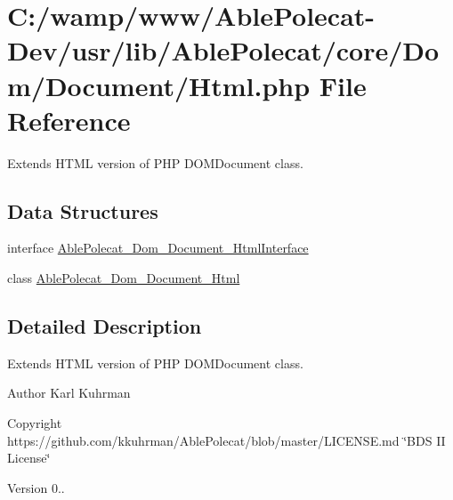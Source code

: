 \hypertarget{_html_8php}{}\section{C\+:/wamp/www/\+Able\+Polecat-\/\+Dev/usr/lib/\+Able\+Polecat/core/\+Dom/\+Document/\+Html.php File Reference}
\label{_html_8php}


Extends H\+T\+M\+L version of P\+H\+P D\+O\+M\+Document class.  


\subsection*{Data Structures}
\begin{DoxyCompactItemize}
\item 
interface \hyperlink{interface_able_polecat___dom___document___html_interface}{Able\+Polecat\+\_\+\+Dom\+\_\+\+Document\+\_\+\+Html\+Interface}
\item 
class \hyperlink{class_able_polecat___dom___document___html}{Able\+Polecat\+\_\+\+Dom\+\_\+\+Document\+\_\+\+Html}
\end{DoxyCompactItemize}


\subsection{Detailed Description}
Extends H\+T\+M\+L version of P\+H\+P D\+O\+M\+Document class. 

\begin{DoxyAuthor}{Author}
Karl Kuhrman 
\end{DoxyAuthor}
\begin{DoxyCopyright}{Copyright}
https\+://github.com/kkuhrman/\+Able\+Polecat/blob/master/\+L\+I\+C\+E\+N\+S\+E.\+md \char`\"{}\+B\+D\+S I\+I License\char`\"{} 
\end{DoxyCopyright}
\begin{DoxyVersion}{Version}
0.. 
\end{DoxyVersion}
